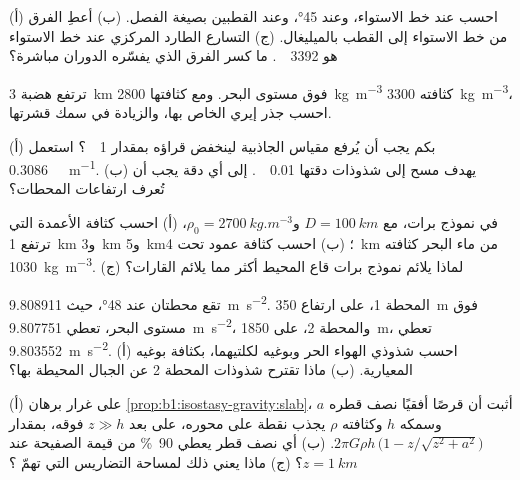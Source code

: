 \begin{exercise}[$\star$]\label{exo:b1:isostasy-gravity:2}
(أ) احسب  عند خط الاستواء، وعند \ang{45}، وعند القطبين بصيغة الفصل. (ب) أعطِ الفرق من خط الاستواء إلى القطب بالميليغال. (ج) التسارع الطارد المركزي عند خط الاستواء هو \qty{3392}{\milli\gal}. ما كسر الفرق الذي يفسّره الدوران مباشرة؟
\end{exercise}

\begin{exercise}[$\star$]\label{exo:b1:isostasy-gravity:3}
ترتفع هضبة \qty{3}{km} فوق مستوى البحر. ومع  كثافتها \qty{2800}{kg.m^{-3}}  كثافته \qty{3300}{kg.m^{-3}}، احسب جذر إيري الخاص بها، والزيادة في سمك قشرتها.
\end{exercise}

\begin{exercise}[$\star$]\label{exo:b1:isostasy-gravity:4}
(أ) بكم يجب أن يُرفع مقياس الجاذبية لينخفض قراؤه بمقدار \qty{1}{\milli\gal}؟ استعمل \qty{0.3086}{\milli\gal.m^{-1}}. (ب) يهدف مسح إلى شذوذات دقتها \qty{0.01}{\milli\gal}. إلى أي دقة يجب أن تُعرف ارتفاعات المحطات؟
\end{exercise}

\begin{exercise}[$\star\star$]\label{exo:b1:isostasy-gravity:5}
في نموذج برات، مع $D = \qty{100}{km}$ و$\rho_0 = \qty{2700}{kg.m^{-3}}$، (أ) احسب كثافة الأعمدة التي ترتفع \qty{1}{km} و\qty{3}{km} و\qty{5}{km}؛ (ب) احسب كثافة عمود تحت \qty{4}{km} من ماء البحر كثافته \qty{1030}{kg.m^{-3}}. (ج) لماذا يلائم نموذج برات قاع المحيط أكثر مما يلائم القارات؟
\end{exercise}

\begin{exercise}[$\star\star$]\label{exo:b1:isostasy-gravity:6}
تقع محطتان عند  \ang{48}، حيث  \qty{9.808911}{m.s^{-2}}. المحطة 1، على ارتفاع \qty{350}{m} فوق مستوى البحر، تعطي \qty{9.807751}{m.s^{-2}}، والمحطة 2، على \qty{1850}{m}، تعطي \qty{9.803552}{m.s^{-2}}. (أ) احسب شذوذي الهواء الحر وبوغيه لكلتيهما، بكثافة بوغيه المعيارية. (ب) ماذا تقترح شذوذات المحطة 2 عن الجبال المحيطة بها؟
\end{exercise}

\begin{exercise}[$\star\star$]\label{exo:b1:isostasy-gravity:7}
(أ) على غرار برهان \cref{prop:b1:isostasy-gravity:slab}، أثبت أن قرصًا أفقيًا نصف قطره $a$ وسمكه $h$ وكثافته $\rho$ يجذب نقطة على محوره، على بعد $z \gg h$ فوقه، بمقدار $2\pi G\rho h\,\bigl(1 -
z/\sqrt{z^2 + a^2}\bigr)$. (ب) أي نصف قطر يعطي \qty{90}{\percent} من قيمة الصفيحة عند $z = \qty{1}{km}$؟ (ج) ماذا يعني ذلك لمساحة التضاريس التي تهمّ ؟
\end{exercise}

